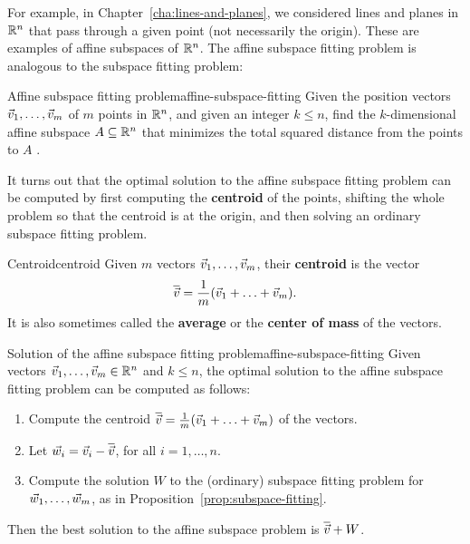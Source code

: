 \documentclass{ximera}
\begin{document}
For example, in Chapter~\ref{cha:lines-and-planes}, we considered
lines and planes in $\mathbb{R}^n$ that pass through a given point (not
necessarily the origin). These are examples of affine subspaces of
$\mathbb{R}^n$. The affine subspace fitting problem is analogous to the
subspace fitting problem:

\begin{problem}{Affine subspace fitting problem}{affine-subspace-fitting}
  Given the position vectors $\vec{v}_1,\ldots,\vec{v}_m$ of $m$
  points in $\mathbb{R}^n$, and given an integer $k\leq n$, find the
  $k$-dimensional affine subspace $A\subseteq\mathbb{R}^n$ that minimizes the
  total squared distance from the points to $A$%
  .
\end{problem}

It turns out that the optimal solution to the affine subspace fitting
problem can be computed by first computing the \textbf{centroid} of
the points, shifting the whole problem so that the centroid is at the
origin, and then solving an ordinary subspace fitting problem.

\begin{definition}{Centroid}{centroid}
  Given $m$ vectors $\vec{v}_1,\ldots,\vec{v}_m$, their
  \textbf{centroid}%
   is the vector
  \begin{equation*}
    \overline{\vec{v}} = \frac{1}{m}(\vec{v}_1+\ldots+\vec{v}_m).
  \end{equation*}
  It is also sometimes called the \textbf{average}%
   or the \textbf{center of mass}%
   of the vectors.
\end{definition}

\begin{proposition}{Solution of the affine subspace fitting problem}{affine-subspace-fitting}
  Given vectors $\vec{v}_1,\ldots,\vec{v}_m\in\mathbb{R}^n$ and $k\leq n$,
  the optimal solution to the affine subspace fitting problem can be
  computed as follows:
  \begin{enumerate}
  \item Compute the centroid $\overline{\vec{v}} =
    \frac{1}{m}(\vec{v}_1+\ldots+\vec{v}_m)$ of the vectors.
  \item Let $\vec{w}_i = \vec{v}_i - \overline{\vec{v}}$, for all
    $i=1,\ldots,n$.
  \item Compute the solution $W$ to the (ordinary) subspace fitting
    problem for $\vec{w}_1,\ldots,\vec{w}_m$, as in
    Proposition~\ref{prop:subspace-fitting}.
  \end{enumerate}
  Then the best solution to the affine subspace problem is
  $\overline{\vec{v}} + W$.
\end{proposition}
\end{document}
